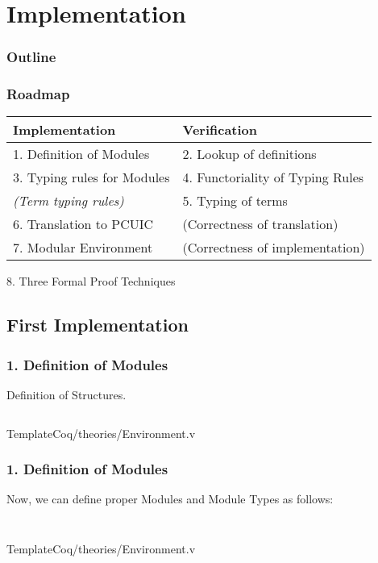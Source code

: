 \section{Implementation}

\newcommand{\tc}[3]{\inputminted[firstline={#1},lastline={#2},linenos]{Coq}{
code/v1/template-coq/theories/#3}}
\newcommand{\pcuic}[3]{\inputminted[firstline={#1},lastline={#2},linenos]{Coq}{
code/v1/pcuic/theories/#3}}

\begin{frame}
  \frametitle{Outline}
  \tableofcontents[currentsection]
\end{frame}

\begin{frame}
  \frametitle{Roadmap}
  \begin{center}
  \begin{tabular}{ |l|l| }
    \hline
    Implementation & Verification \\
    \hline\hline
    {1. Definition of Modules }& 2. Lookup of definitions\\
    3. Typing rules for Modules & 4. Functoriality of Typing Rules\\
    \emph{(Term typing rules)} & 5. Typing of terms\\
    6. Translation to PCUIC & (Correctness of translation)\\
    \hline
    7. Modular Environment & (Correctness of implementation)\\
    \hline\hline
  \end{tabular}
  \end{center}
  8. Three Formal Proof Techniques
\end{frame}

\subsection{First Implementation}

\begin{frame}
  \frametitle{1. Definition of Modules}
  Definition of Structures.
\begin{listing}[H]
  \tc{324}{336}{Environment.v}
  \caption{TemplateCoq/theories/Environment.v}
\end{listing}
\end{frame}

\begin{frame}
  \frametitle{1. Definition of Modules}
Now, we can define proper Modules and Module Types as follows:
\begin{listing}[H]
  \tc{344}{345}{Environment.v}
  \tc{347}{351}{Environment.v}
  \caption{TemplateCoq/theories/Environment.v}
\end{listing}
\end{frame}

